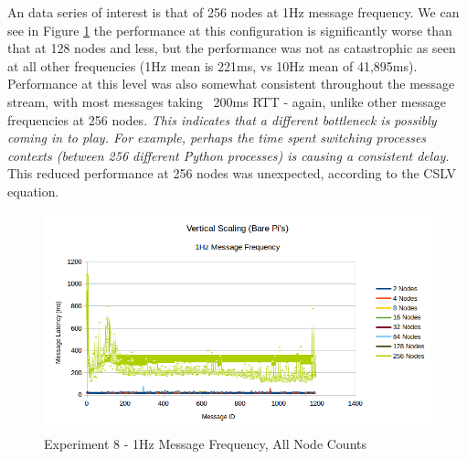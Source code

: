 \documentclass[../dissertation.tex]{subfiles}
\begin{document}
An data series of interest is that of 256 nodes at 1Hz message frequency. We can see in Figure \ref{exp8-1hz-all-nodes} the performance at this configuration is significantly worse than that at 128 nodes and less, but the performance was not as catastrophic as seen at all other frequencies (1Hz mean is 221ms, vs 10Hz mean of 41,895ms). Performance at this level was also somewhat consistent throughout the message stream, with most messages taking ~200ms RTT - again, unlike other message frequencies at 256 nodes. \textit{This indicates that a different bottleneck is possibly coming in to play. For example, perhaps the time spent switching processes contexts (between 256 different Python processes) is causing a consistent delay.} This reduced performance at 256 nodes was unexpected, according to the CSLV equation.

\begin{figure}[H]
\centering
\includegraphics[width=\textwidth]{images/experiment8/vertical_scaling_1hz_all_node_counts.png}
\caption{Experiment 8 - 1Hz Message Frequency, All Node Counts}
\label{exp8-1hz-all-nodes}
\end{figure}
\end{document}
